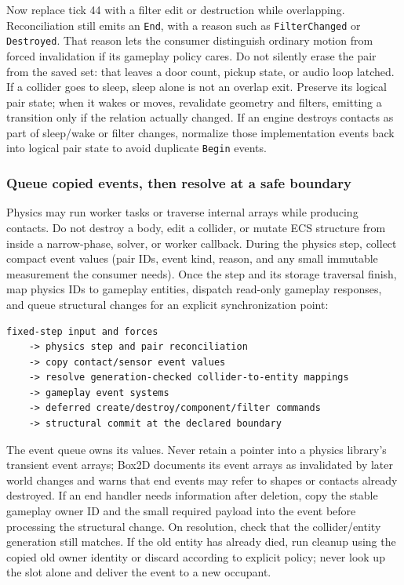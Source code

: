 Now replace tick 44 with a filter edit or destruction while overlapping. Reconciliation still emits an \texttt{End}, with a reason such as \texttt{FilterChanged} or \texttt{Destroyed}. That reason lets the consumer distinguish ordinary motion from forced invalidation if its gameplay policy cares. Do not silently erase the pair from the saved set: that leaves a door count, pickup state, or audio loop latched. If a collider goes to sleep, sleep alone is not an overlap exit. Preserve its logical pair state; when it wakes or moves, revalidate geometry and filters, emitting a transition only if the relation actually changed. If an engine destroys contacts as part of sleep/wake or filter changes, normalize those implementation events back into logical pair state to avoid duplicate \texttt{Begin} events.

\subsubsection{Queue copied events, then resolve at a safe boundary}\label{05-engine-i-ch017-queue-copied-events-then-resolve-at-a-safe-boundary}

Physics may run worker tasks or traverse internal arrays while producing contacts. Do not destroy a body, edit a collider, or mutate ECS structure from inside a narrow-phase, solver, or worker callback. During the physics step, collect compact event values (pair IDs, event kind, reason, and any small immutable measurement the consumer needs). Once the step and its storage traversal finish, map physics IDs to gameplay entities, dispatch read-only gameplay responses, and queue structural changes for an explicit synchronization point:

\begin{verbatim}
fixed-step input and forces
    -> physics step and pair reconciliation
    -> copy contact/sensor event values
    -> resolve generation-checked collider-to-entity mappings
    -> gameplay event systems
    -> deferred create/destroy/component/filter commands
    -> structural commit at the declared boundary
\end{verbatim}

The event queue owns its values. Never retain a pointer into a physics library's transient event arrays; Box2D documents its event arrays as invalidated by later world changes and warns that end events may refer to shapes or contacts already destroyed. If an end handler needs information after deletion, copy the stable gameplay owner ID and the small required payload into the event before processing the structural change. On resolution, check that the collider/entity generation still matches. If the old entity has already died, run cleanup using the copied old owner identity or discard according to explicit policy; never look up the slot alone and deliver the event to a new occupant.

